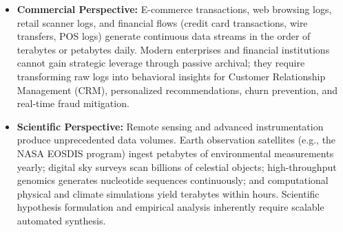 \begin{itemize}
    \item \textbf{Commercial Perspective:} E-commerce transactions, web browsing logs, retail scanner logs, and financial flows (credit card transactions, wire transfers, POS logs) generate continuous data streams in the order of terabytes or petabytes daily. Modern enterprises and financial institutions cannot gain strategic leverage through passive archival; they require transforming raw logs into behavioral insights for Customer Relationship Management (CRM), personalized recommendations, churn prevention, and real-time fraud mitigation.
    \item \textbf{Scientific Perspective:} Remote sensing and advanced instrumentation produce unprecedented data volumes. Earth observation satellites (e.g., the NASA EOSDIS program) ingest petabytes of environmental measurements yearly; digital sky surveys scan billions of celestial objects; high-throughput genomics generates nucleotide sequences continuously; and computational physical and climate simulations yield terabytes within hours. Scientific hypothesis formulation and empirical analysis inherently require scalable automated synthesis.
\end{itemize}

